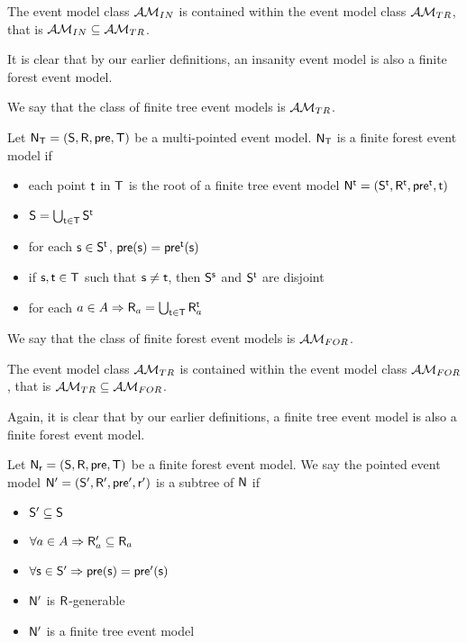 \begin{lemma} \label{insaneIsTree}
The event model class $\insaneClass$ is contained within the event model class
$\treeClass$, that is $\insaneClass \subseteq \treeClass$.
\end{lemma}

It is clear that by our earlier definitions, an insanity event model is also a finite forest event
model.

We say that the class of finite tree event models is $\treeClass$.

\begin{defn} \label{forest}
Let $\evM_\evT = (\evS, \evR, \evpr, \evT)$ be a multi-pointed event model.
$\evM_\evT$ is a finite forest event model if
\begin{itemize}
	\item each point $\evt$ in $\evT$ is the root of a finite tree event model $\evM^\evt =
	(\evS^\evt, \evR^\evt,
	\evpr^\evt, \evt)$
  \item $\evS = \bigcup_{\evt \in \evT} \evS^\evt$
	\item for each $\evs \in \evS^\evt$, $\evpr(\evs) = \evpr^\evt(\evs)$
	\item if $\evs, \evt \in \evT$ such that $\evs \neq \evt$, then $\evS^\evs$ and $\evS^\evt$ are disjoint
  \item for each $a \in A \Rightarrow \evR_a = \bigcup_{\evt \in \evT} \evR_a^\evt$
\end{itemize}
\end{defn}

We say that the class of finite forest event models is $\forestClass$.

\begin{lemma} \label{treeIsForest}
The event model class $\treeClass$ is contained within the event model class
$\forestClass$, that is $\treeClass \subseteq \forestClass$.
\end{lemma}

Again, it is clear that by our earlier definitions, a finite tree event model is also a finite forest event
model.

\begin{defn} \label{subtree}
Let $\evM_\evr = (\evS, \evR, \evpr, \evT)$ be a finite forest event model.
We say the pointed event model $\evM' = (\evS', \evR', \evpr', \evr')$ is a subtree of $\evM$ if
\begin{itemize}
	\item $\evS' \subseteq \evS$
	\item $\forall a \in A \Rightarrow \evR_a' \subseteq \evR_a$
	\item $\forall \evs \in \evS' \Rightarrow \evpr(\evs) = \evpr'(\evs) $
	\item $\evM'$ is $\evR$-generable
	\item $\evM'$ is a finite tree event model
\end{itemize}
\end{defn}

